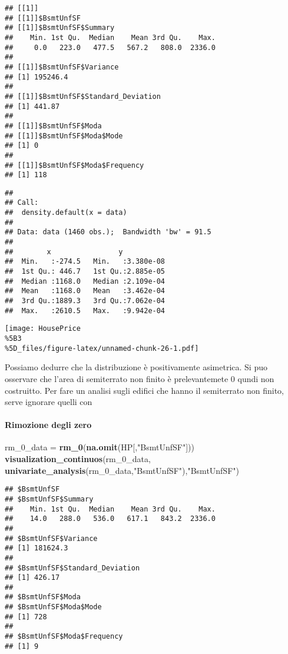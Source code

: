 \documentclass[
]{article}
\newenvironment{Shaded}{\begin{snugshade}}{\end{snugshade}}
\newcommand{\FunctionTok}[1]{\textcolor[rgb]{0.13,0.29,0.53}{\textbf{#1}}}
\newcommand{\NormalTok}[1]{#1}
\newcommand{\OtherTok}[1]{\textcolor[rgb]{0.56,0.35,0.01}{#1}}
\newcommand{\StringTok}[1]{\textcolor[rgb]{0.31,0.60,0.02}{#1}}
\begin{document}
\begin{verbatim}
## [[1]]
## [[1]]$BsmtUnfSF
## [[1]]$BsmtUnfSF$Summary
##    Min. 1st Qu.  Median    Mean 3rd Qu.    Max. 
##     0.0   223.0   477.5   567.2   808.0  2336.0 
## 
## [[1]]$BsmtUnfSF$Variance
## [1] 195246.4
## 
## [[1]]$BsmtUnfSF$Standard_Deviation
## [1] 441.87
## 
## [[1]]$BsmtUnfSF$Moda
## [[1]]$BsmtUnfSF$Moda$Mode
## [1] 0
## 
## [[1]]$BsmtUnfSF$Moda$Frequency
## [1] 118
\end{verbatim}

\begin{verbatim}
## 
## Call:
##  density.default(x = data)
## 
## Data: data (1460 obs.);  Bandwidth 'bw' = 91.5
## 
##        x                y            
##  Min.   :-274.5   Min.   :3.380e-08  
##  1st Qu.: 446.7   1st Qu.:2.885e-05  
##  Median :1168.0   Median :2.109e-04  
##  Mean   :1168.0   Mean   :3.462e-04  
##  3rd Qu.:1889.3   3rd Qu.:7.062e-04  
##  Max.   :2610.5   Max.   :9.942e-04
\end{verbatim}

\texttt{[image: HousePrice\\\%5B3\\\%5D\_files/figure-latex/unnamed-chunk-26-1.pdf]}

Possiamo dedurre che la distribuzione è positivamente asimetrica. Si puo
osservare che l'area di semiterrato non finito è prelevantemete 0 qundi
non costruitto. Per fare un analisi sugli edifici che hanno il
semiterrato non finito, serve ignorare quelli con

\paragraph{Rimozione degli zero}\label{rimozione-degli-zero-4}

\begin{Shaded}
\begin{Highlighting}[]
\NormalTok{rm\_0\_data }\OtherTok{=} \FunctionTok{rm\_0}\NormalTok{(}\FunctionTok{na.omit}\NormalTok{(HP[,}\StringTok{"BsmtUnfSF"}\NormalTok{]))}
\FunctionTok{visualization\_continuos}\NormalTok{(rm\_0\_data, }\FunctionTok{univariate\_analysis}\NormalTok{(rm\_0\_data,}\StringTok{"BsmtUnfSF"}\NormalTok{),}\StringTok{"BsmtUnfSF"}\NormalTok{)}
\end{Highlighting}
\end{Shaded}

\begin{verbatim}
## $BsmtUnfSF
## $BsmtUnfSF$Summary
##    Min. 1st Qu.  Median    Mean 3rd Qu.    Max. 
##    14.0   288.0   536.0   617.1   843.2  2336.0 
## 
## $BsmtUnfSF$Variance
## [1] 181624.3
## 
## $BsmtUnfSF$Standard_Deviation
## [1] 426.17
## 
## $BsmtUnfSF$Moda
## $BsmtUnfSF$Moda$Mode
## [1] 728
## 
## $BsmtUnfSF$Moda$Frequency
## [1] 9
\end{verbatim}
\end{document}
